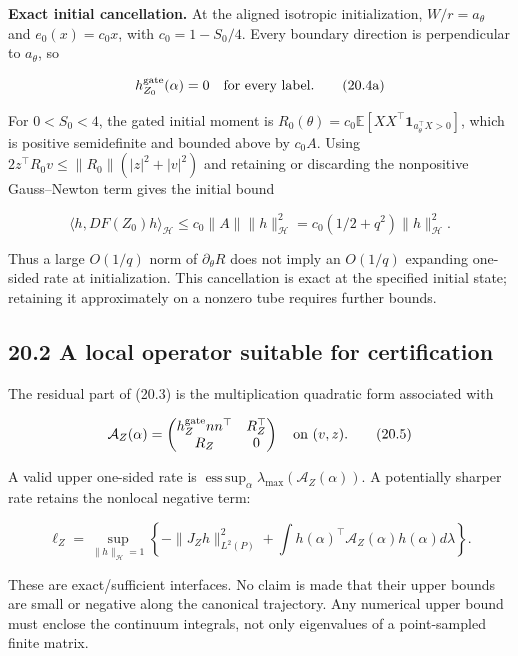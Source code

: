 \documentclass[
  10pt,
]{article}
\begin{document}
\textbf{Exact initial cancellation.} At the aligned isotropic
initialization, \(W/r=a_\theta\) and \(e_0(x)=c_0x\), with
\(c_0=1-S_0/4\). Every boundary direction is perpendicular to
\(a_\theta\), so

\[
 h_{Z_0}^{\rm gate}(\alpha)=0\quad\text{for every label}.
 \tag{20.4a}
\]

For \(0<S_0<4\), the gated initial moment is
\(R_0(\theta)=c_0\mathbb E[XX^\top\mathbf1_{a_\theta^\top X>0}]\), which
is positive semidefinite and bounded above by \(c_0A\). Using
\(2z^\top R_0v\le\|R_0\|(|z|^2+|v|^2)\) and retaining or discarding the
nonpositive Gauss--Newton term gives the initial bound

\[
 \langle h,DF(Z_0)h\rangle_{\mathcal H}
 \le c_0\|A\|\|h\|_{\mathcal H}^2
 =c_0(1/2+q^2)\|h\|_{\mathcal H}^2.
 \tag{20.4b}
\]

Thus a large \(O(1/q)\) norm of \(\partial_\theta R\) does not imply an
\(O(1/q)\) expanding one-sided rate at initialization. This cancellation
is exact at the specified initial state; retaining it approximately on a
nonzero tube requires further bounds.

\subsection{20.2 A local operator suitable for
certification}\label{a-local-operator-suitable-for-certification}

The residual part of (20.3) is the multiplication quadratic form
associated with

\[
 \mathcal A_Z(\alpha)=
 \begin{pmatrix}
 h_Z^{\rm gate}nn^\top&R_Z^\top\\
 R_Z&0
 \end{pmatrix}
 \quad\text{on }(v,z).
 \tag{20.5}
\]

A valid upper one-sided rate is
\(\operatorname*{ess\,sup}_\alpha\lambda_{\max}(\mathcal A_Z(\alpha))\).
A potentially sharper rate retains the nonlocal negative term:

\[
 \ell_Z=\sup_{\|h\|_{\mathcal H}=1}
 \left\{-\|J_Zh\|_{L^2(P)}^2
      +\int h(\alpha)^\top\mathcal A_Z(\alpha)h(\alpha)d\lambda\right\}.
 \tag{20.6}
\]

These are exact/sufficient interfaces. No claim is made that their upper
bounds are small or negative along the canonical trajectory. Any
numerical upper bound must enclose the continuum integrals, not only
eigenvalues of a point-sampled finite matrix.
\end{document}
